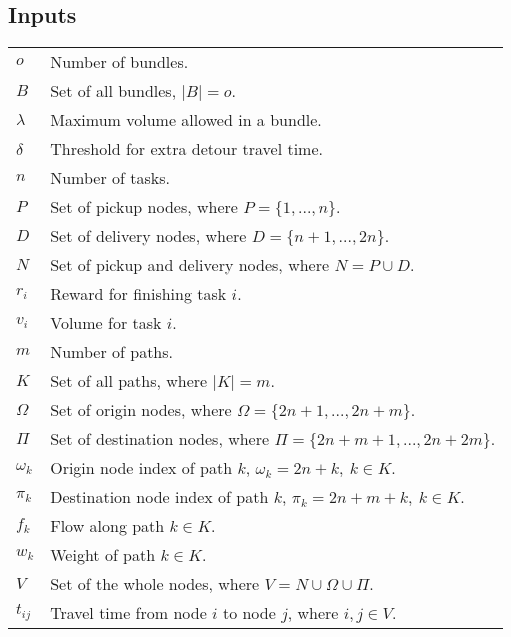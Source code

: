 \documentclass{article}
\begin{document}
\begin{multicols}{2}

\setcounter{secnumdepth}{0} %

\section{Inputs}

\vspace{0.2cm}
\renewcommand{\arraystretch}{1.5}
\begin{supertabular}{L{0.58cm} L{7.2cm}}
	$o$ 		& Number of bundles. \\
	$B$ 		& Set of all bundles, $|B| = o$. \\
	$\lambda$ 	& Maximum volume allowed in a bundle. \\
	$\delta$ 	& Threshold for extra detour travel time. \\
	$n$ 		& Number of tasks. \\
	$P$ 		& Set of pickup nodes, where $P = \{1,...,n\}$. \\
	$D$ 		& Set of delivery nodes, where $D = \{n+1,...,2n\}$. \\
	$N$ 		& Set of pickup and delivery nodes, where $N = P \cup D$. \\
	$r_i$ 		& Reward for finishing task $i$. \\
	$v_i$ 		& Volume for task $i$. \\
	$m$ 		& Number of paths. \\
	$K$ 		& Set of all paths, where $|K| = m$. \\
	$\Omega$ 	& Set of origin nodes, where $\Omega = \{2n+1,...,2n+m\}$. \\
	$\Pi$ 		& Set of destination nodes, where $\Pi = \{2n+m+1,...,2n+2m\}$. \\
	$\omega_k$ 	& Origin node index of path $k$, $\omega_k = 2n + k,~k \in K$. \\
	$\pi_k$ 	& Destination node index of path $k$, $\pi_k = 2n + m + k,~k \in K$. \\
	$f_k$ 		& Flow along path $k \in K$. \\
	$w_k$ 		& Weight of path $k \in K$. \\
	$V$ 		& Set of the whole nodes, where $V = N \cup \Omega \cup \Pi$. \\	
	$t_{ij}$ 	& Travel time from node $i$ to node $j$, where $i, j \in V$. \\
\end{supertabular}

\vfill\null


\end{multicols}
\end{document}
